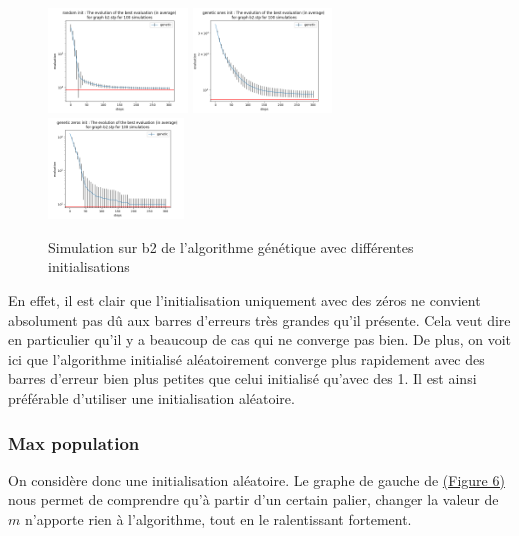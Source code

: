 \documentclass[11pt,french]{report}
\begin{document}
        \begin{figure}
          \includegraphics[width=0.33\textwidth]{best_b2_evaluation_genetic random init.png}
          \includegraphics[width=0.33\textwidth]{best_b2_evaluation_genetic ones init.png}
          \includegraphics[width=0.32\textwidth]{best_b2_evaluation_genetic zeros init.png}
          \caption{Simulation sur b2 de l'algorithme génétique avec différentes initialisations}
          \label{Figure5}
        \end{figure}
        

        En effet, il est clair que l'initialisation uniquement avec des zéros ne convient absolument pas dû aux barres d'erreurs très grandes qu'il présente. Cela veut dire en particulier qu'il y a beaucoup de cas qui ne converge pas bien. De plus, on voit ici que l'algorithme initialisé aléatoirement converge plus rapidement avec des barres d'erreur bien plus petites que celui initialisé qu'avec des 1.
        Il est ainsi préférable d'utiliser une initialisation aléatoire.

        \subsubsection{Max population}
        On considère donc une initialisation aléatoire. Le graphe de gauche de  \hyperref[Figure6]{(Figure 6)} nous permet de comprendre qu'à partir d'un certain palier, changer la valeur de \hyperref[sélection]{$m$} n'apporte rien à l'algorithme, tout en le ralentissant fortement.
\end{document}
